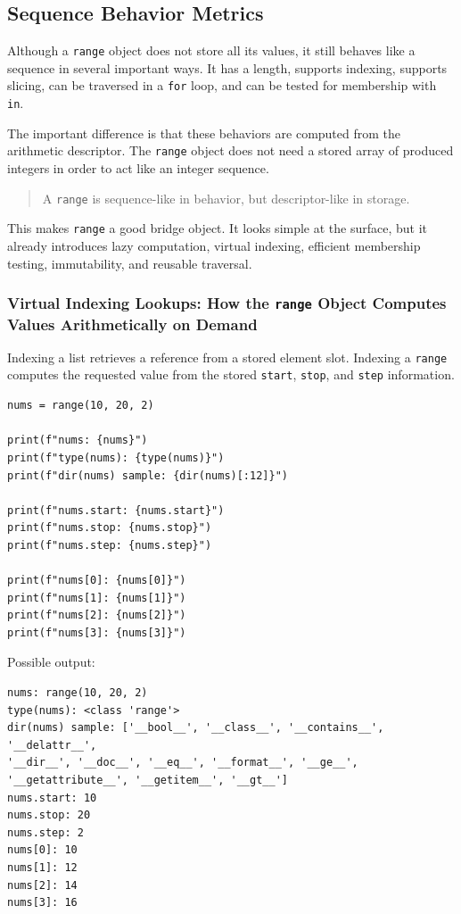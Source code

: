 \subsection{Sequence Behavior Metrics}

Although a \texttt{range} object does not store all its values, it still behaves like a sequence in several important ways. It has a length, supports indexing, supports slicing, can be traversed in a \texttt{for} loop, and can be tested for membership with \texttt{in}.

The important difference is that these behaviors are computed from the arithmetic descriptor. The \texttt{range} object does not need a stored array of produced integers in order to act like an integer sequence.

\begin{quote}
A \texttt{range} is sequence-like in behavior, but descriptor-like in storage.
\end{quote}

This makes \texttt{range} a good bridge object. It looks simple at the surface, but it already introduces lazy computation, virtual indexing, efficient membership testing, immutability, and reusable traversal.

\subsubsection{Virtual Indexing Lookups: How the \texttt{range} Object Computes Values Arithmetically on Demand}

Indexing a list retrieves a reference from a stored element slot. Indexing a \texttt{range} computes the requested value from the stored \texttt{start}, \texttt{stop}, and \texttt{step} information.

\begin{verbatim}
nums = range(10, 20, 2)

print(f"nums: {nums}")
print(f"type(nums): {type(nums)}")
print(f"dir(nums) sample: {dir(nums)[:12]}")

print(f"nums.start: {nums.start}")
print(f"nums.stop: {nums.stop}")
print(f"nums.step: {nums.step}")

print(f"nums[0]: {nums[0]}")
print(f"nums[1]: {nums[1]}")
print(f"nums[2]: {nums[2]}")
print(f"nums[3]: {nums[3]}")
\end{verbatim}

Possible output:

\begin{verbatim}
nums: range(10, 20, 2)
type(nums): <class 'range'>
dir(nums) sample: ['__bool__', '__class__', '__contains__', '__delattr__',
'__dir__', '__doc__', '__eq__', '__format__', '__ge__',
'__getattribute__', '__getitem__', '__gt__']
nums.start: 10
nums.stop: 20
nums.step: 2
nums[0]: 10
nums[1]: 12
nums[2]: 14
nums[3]: 16
\end{verbatim}


